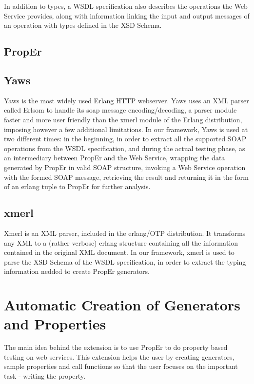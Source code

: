 \documentclass[submission,copyright,a4]{eptcs}
\begin{document}
In addition to types, a WSDL specification also describes the operations the Web Service provides, along with information linking the input and output messages of an operation with types defined in the XSD Schema. 

\subsection{PropEr}

\subsection{Yaws}

Yaws is the most widely used Erlang HTTP webserver. Yaws uses an XML parser called Erlsom to handle its soap message encoding/decoding, a parser module faster and more user friendly than the xmerl module of the Erlang distribution, imposing however a few additional limitations. In our framework, Yaws is used at two different times: in the beginning, in order to extract all the supported SOAP operations from the WSDL specification, and during the actual testing phase, as an intermediary between PropEr and the Web Service, wrapping the data generated by PropEr in valid SOAP structure, invoking a Web Service operation with the formed SOAP message, retrieving the result and returning it in the form of an erlang tuple to PropEr for further analysis.

\subsection{xmerl}

Xmerl is an XML parser, included in the erlang/OTP distribution. It transforms any XML to a (rather verbose) erlang structure containing all the information contained in the original XML document. In our framework, xmerl is used to parse the XSD Schema of the WSDL specification, in order to extract the typing information nedded to create PropEr generators.

\section{Automatic Creation of Generators and Properties}

The main idea behind the extension is to use PropEr to do property based testing on web services. This extension helps the user by creating generators, sample properties and call functions so that the user focuses on the important task - writing the property. 
\end{document}
